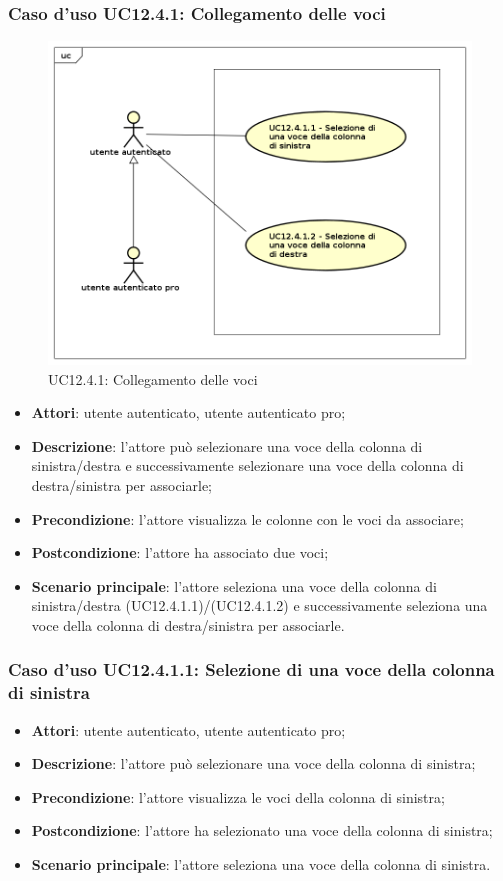\subsubsection{Caso d'uso UC12.4.1: Collegamento delle voci}
\label{UC12.4.1}
\begin{figure}[h]
	\centering
	\includegraphics[scale=0.5]{UML/UC12_4_1.png}
	\caption{UC12.4.1: Collegamento delle voci}
\end{figure}
\begin{itemize}
\item \textbf{Attori}: utente autenticato, utente autenticato pro;
\item \textbf{Descrizione}: l'attore può selezionare una voce della colonna di sinistra/destra e successivamente selezionare una voce della colonna di destra/sinistra per associarle;
\item \textbf{Precondizione}: l'attore visualizza le colonne con le voci da associare;
\item \textbf{Postcondizione}: l'attore ha associato due voci;
\item \textbf{Scenario principale}: l'attore seleziona una voce della colonna di sinistra/destra (UC12.4.1.1)/(UC12.4.1.2) e successivamente seleziona una voce della colonna di destra/sinistra per associarle.
\end{itemize}

\subsubsection{Caso d'uso UC12.4.1.1: Selezione di una voce della colonna di sinistra}
\begin{itemize}
\item \textbf{Attori}: utente autenticato, utente autenticato pro;
\item \textbf{Descrizione}: l'attore può selezionare una voce della colonna di sinistra;
\item \textbf{Precondizione}: l'attore visualizza le voci della colonna di sinistra;
\item \textbf{Postcondizione}: l'attore ha selezionato una voce della colonna di sinistra;
\item \textbf{Scenario principale}: l'attore seleziona una voce della colonna di sinistra. 
\end{itemize}

